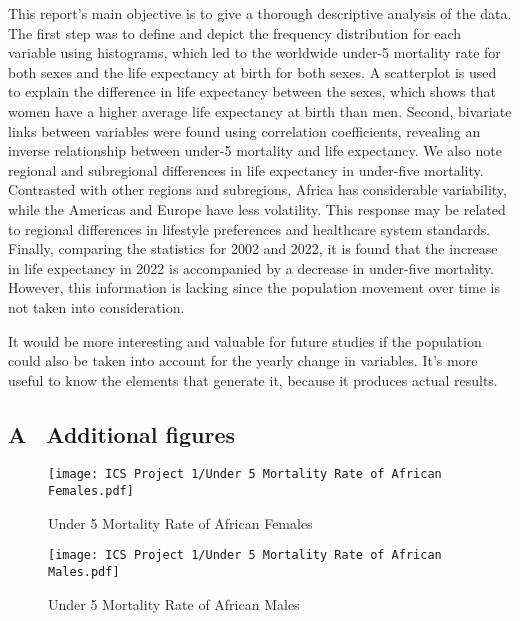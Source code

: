 \documentclass[12 pt]{scrartcl}
\begin{document}
This report's main objective is to give a thorough descriptive analysis of the data. The first step was to define and depict the frequency distribution for each variable using histograms, which led to the worldwide under-5 mortality rate for both sexes and the life expectancy at birth for both sexes. A scatterplot is used to explain the difference in life expectancy between the sexes, which shows that women have a higher average life expectancy at birth than men. Second, bivariate links between variables were found using correlation coefficients, revealing an inverse relationship between under-5 mortality and life expectancy. We also note regional and subregional differences in life expectancy in under-five mortality. Contrasted with other regions and subregions, Africa has considerable variability, while the Americas and Europe have less volatility. This response may be related to regional differences in lifestyle preferences and healthcare system standards. Finally, comparing the statistics for 2002 and 2022, it is found that the increase in life expectancy in 2022 is accompanied by a decrease in under-five mortality. However, this information is lacking since the population movement over time is not taken into consideration.

It would be more interesting and valuable for future studies if the population could also be taken into account for the yearly change in variables. It's more useful to know the elements that generate it, because it produces actual results.

 

\newpage
{}
\renewcommand\refname{Bibliography} 



\newpage
\appendix 
{}
\subsection*{A \ Additional figures}

\begin{figure}[ht]
    \centering
    \texttt{[image: ICS Project 1/Under 5 Mortality Rate of African Females.pdf]}
    \caption{Under 5 Mortality Rate of African Females}
    \label{fig:my_label}
\end{figure}

\begin{figure}[ht]
    \centering
    \texttt{[image: ICS Project 1/Under 5 Mortality Rate of African Males.pdf]}
    \caption{Under 5 Mortality Rate of African Males}
    \label{fig:my_label}
\end{figure}
\end{document}
